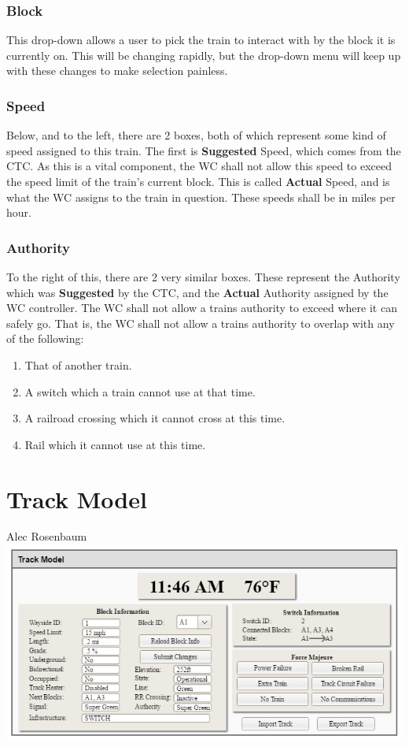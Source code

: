 \documentclass{scrreprt}
\begin{document}
\subsection{Block}
This drop-down allows a user to pick the train to interact with by the block it is currently on.
This will be changing rapidly, but the drop-down menu will keep up with these changes to make selection painless.

\subsection{Speed}
Below, and to the left, there are 2 boxes, both of which represent some kind of speed assigned to this train. The first is \textbf{Suggested} Speed, which comes from the CTC.
As this is a vital component, the WC shall not allow this speed to exceed the speed limit of the train's current block.
This is called \textbf{Actual} Speed, and is what the WC assigns to the train in question.
These speeds shall be in miles per hour.

\subsection{Authority}
To the right of this, there are 2 very similar boxes.
These represent the Authority which was \textbf{Suggested} by the CTC, and the \textbf{Actual} Authority assigned by the WC controller.
The WC shall not allow a trains authority to exceed where it can safely go.
That is, the WC shall not allow a trains authority to overlap with any of the following:

\begin{enumerate}
    \item That of another train.
    \item A switch which a train cannot use at that time.
    \item A railroad crossing which it cannot cross at this time.
    \item Rail which it cannot use at this time.
\end{enumerate}



\chapter{Track Model}
\Large{Alec Rosenbaum}\\
\includegraphics[width=\textwidth]{track-model}
\end{document}
